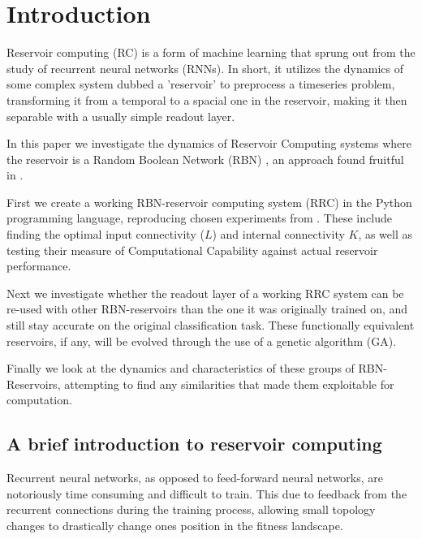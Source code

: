 \section{Introduction}

Reservoir computing (RC) is a form of machine learning that sprung out from the study of recurrent neural networks (RNNs).
In short, it utilizes the dynamics of some complex system dubbed a 'reservoir' to preprocess a timeseries problem,
transforming it from a temporal to a spacial one in the reservoir, making it then separable with a usually simple readout layer.

In this paper we investigate the dynamics of Reservoir Computing systems where the reservoir is a Random Boolean Network (RBN) \cite{gershenson2004introduction},
an approach found fruitful in \cite{rbn-reservoir}.

First we create a working RBN-reservoir computing system (RRC) in the Python programming language,
reproducing chosen experiments from \cite{rbn-reservoir}.
These include finding the optimal input connectivity ($L$) and internal connectivity $K$,
as well as testing their measure of Computational Capability against actual reservoir performance.

Next we investigate whether the readout layer of a working RRC system can be re-used with other RBN-reservoirs than the one it was originally trained on,
and still stay accurate on the original classification task.
These functionally equivalent reservoirs, if any, will be evolved through the use of a genetic algorithm (GA).

Finally we look at the dynamics and characteristics of these groups of RBN-Reservoirs,
attempting to find any similarities that made them exploitable for computation.


\subsection{A brief introduction to reservoir computing}

Recurrent neural networks, as opposed to feed-forward neural networks,
are notoriously time consuming and difficult to train.
This due to feedback from the recurrent connections during the training process,
allowing small topology changes to drastically change ones position in the fitness landscape.


